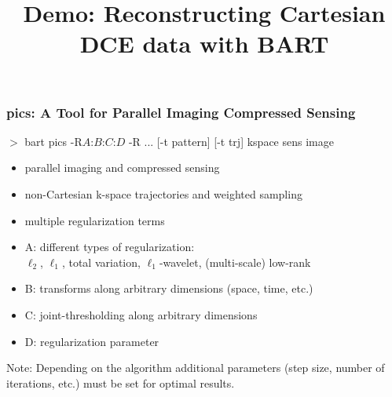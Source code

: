 \documentclass{beamer}
\title{\large Demo: Reconstructing Cartesian DCE data with BART}
\begin{document}
\frame{\titlepage}








\begin{frame}
\frametitle{pics: A Tool for Parallel Imaging Compressed Sensing}

$>$ bart pics {\color{violet}-R}{\color{yellow}$A$}:{\color{blue}$B$}:{\color{cyan}$C$}:{\color{pink}$D$}
{\color{violet}-R} ... {\color{red}[-t pattern]} {\color{red}[-t trj]} kspace {\color{green}sens} image

\vspace{0.5cm}
\begin{itemize}
\item {\color{green}parallel imaging} and compressed sensing
\item {\color{red}non-Cartesian k-space trajectories and weighted sampling}
\item {\color{violet}multiple regularization terms}
\item {\color{yellow}A:} different {\color{yellow}types of regularization}: \\
		$\ell_2$, $\ell_1$, total variation,  $\ell_1$-wavelet, (multi-scale) low-rank
\item {\color{blue}B: transforms} along {\color{blue}arbitrary dimensions} (space, time, etc.)
\item {\color{cyan}C: joint-thresholding} along arbitrary dimensions
\item {\color{pink}D: regularization parameter}
\end{itemize}

\vfill
{\small
Note: Depending on the algorithm additional parameters (step size, number of iterations, etc.)
must be set for optimal results.}

\end{frame}
\end{document}

